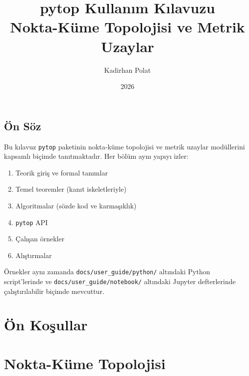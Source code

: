 \documentclass[12pt, a4paper, oneside]{book}
\title{%
  \Huge\bfseries pytop Kullanım Kılavuzu\\[0.5em]
  \Large Nokta-Küme Topolojisi ve Metrik Uzaylar
}
\author{Kadirhan Polat}
\date{2026}
\theoremstyle{definition}
\theoremstyle{remark}
\begin{document}
\maketitle

\frontmatter

\tableofcontents

\chapter*{Ön Söz}

Bu kılavuz \texttt{pytop} paketinin nokta-küme topolojisi ve metrik uzaylar
modüllerini kapsamlı biçimde tanıtmaktadır.
Her bölüm aynı yapıyı izler:
\begin{enumerate}
  \item Teorik giriş ve formal tanımlar
  \item Temel teoremler (kanıt iskeletleriyle)
  \item Algoritmalar (sözde kod ve karmaşıklık)
  \item \texttt{pytop} API
  \item Çalışan örnekler
  \item Alıştırmalar
\end{enumerate}

Örnekler aynı zamanda \texttt{docs/user\_guide/python/} altındaki Python
script'lerinde ve \texttt{docs/user\_guide/notebook/} altındaki Jupyter
defterlerinde çalıştırılabilir biçimde mevcuttur.

\mainmatter

\part{Ön Koşullar}





\part{Nokta-Küme Topolojisi}











\end{document}
